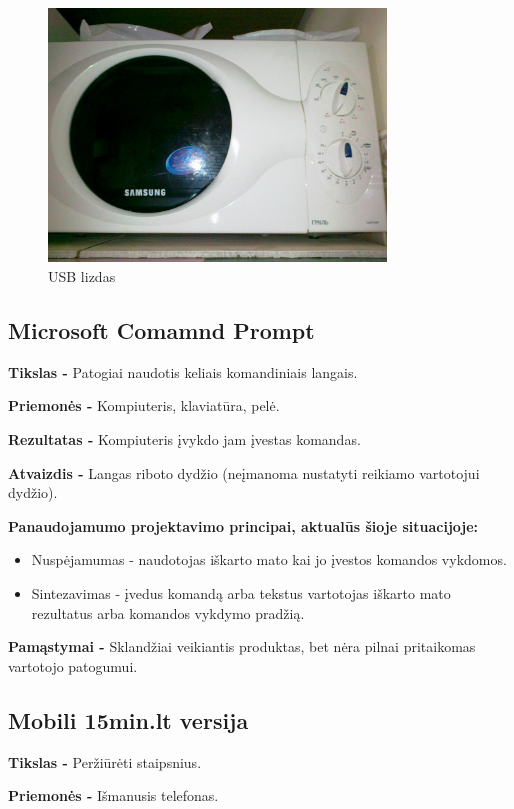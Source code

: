 ﻿\documentclass[a4paper, 12pt]{article}
\begin{document}
		\begin{figure}[h]
		\centering
		\includegraphics[width=0.8\textwidth]{mikrobange.JPG}
		\caption{USB lizdas}
		\label{overflow}
		\end{figure}		
	\subsection{Microsoft Comamnd Prompt}
		\textbf{Tikslas -}
		Patogiai naudotis keliais komandiniais langais.
		
		\textbf{Priemonės -}
		Kompiuteris, klaviatūra, pelė.
		
		\textbf{Rezultatas -}
		Kompiuteris įvykdo jam įvestas komandas.	
		
		\textbf{Atvaizdis -}
		Langas riboto dydžio (neįmanoma nustatyti reikiamo vartotojui dydžio).

		\textbf{Panaudojamumo projektavimo principai, aktualūs šioje situacijoje:}
		\begin{itemize}
		\item Nuspėjamumas - naudotojas iškarto mato kai jo įvestos komandos vykdomos.
		\item Sintezavimas - įvedus komandą arba tekstus vartotojas iškarto mato rezultatus arba komandos vykdymo pradžią.
		\end{itemize}

		\textbf{Pamąstymai -}
		Sklandžiai veikiantis produktas, bet nėra pilnai pritaikomas vartotojo patogumui.

	\subsection{Mobili 15min.lt versija}	
		\textbf{Tikslas -}
		Peržiūrėti staipsnius.

		\textbf{Priemonės -}
		Išmanusis telefonas.
\end{document}
